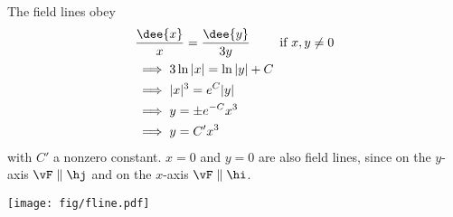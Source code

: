 \begin{solution} 
 The field lines obey
\begin{align*}
&\frac{\dee{x}}{x}=\frac{\dee{y}}{3y}\qquad\text{ if $x,y\ne 0$}\\
&\implies 3\ln |x|=\ln |y|+C\\
&\implies |x|^3=e^C|y| \\
&\implies y=\pm e^{-C}x^3 \\
&\implies y=C'x^3
\end{align*}
with $C'$ a nonzero constant.
$x=0$ and $y=0$ are also field lines,
since on the $y$-axis $\vF\parallel\hj$ and
on the $x$-axis $\vF\parallel\hi$.

\begin{center}
   \texttt{[image: fig/fline.pdf]}
\end{center}
\end{solution}





